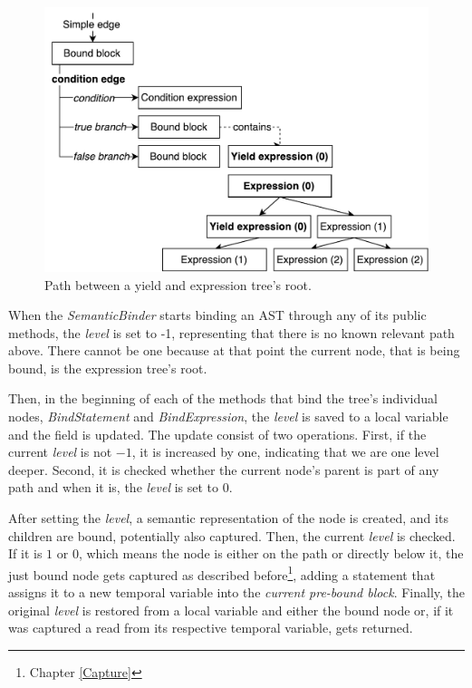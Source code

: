 \begin{figure}[H]
	\centering	
	\includegraphics[scale=0.75]{../img/5_3_path}	
	\caption{Path between a yield and expression tree's root.}
	\label{fig5.3:Path}
\end{figure}

When the \emph{SemanticBinder} starts binding an AST through any of its public methods, the \emph{level} is set to -1, representing that there is no known relevant path above. There cannot be one because at that point the current node, that is being bound, is the expression tree’s root. 

Then, in the beginning of each of the methods that bind the tree’s individual nodes, \emph{BindStatement} and \emph{BindExpression}, the \emph{level} is saved to a local variable and the field is updated. The update consist of two operations. First, if the current \emph{level} is not $-1$, it is increased by one, indicating that we are one level deeper. Second, it is checked whether the current node’s parent is part of any path and when it is, the \emph{level} is set to $0$. 

After setting the \emph{level}, a semantic representation of the node is created, and its children are bound, potentially also captured. Then, the current \emph{level} is checked. If it is $1$ or $0$, which means the node is either on the path or directly below it, the just bound node gets captured as described before\footnote{Chapter \ref{Capture}}, adding a statement that assigns it to a new temporal variable into the \emph{current pre-bound block}. Finally, the original \emph{level} is restored from a local variable and either the bound node or, if it was captured a read from its respective temporal variable, gets returned.

